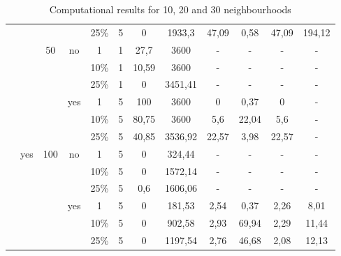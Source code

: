 \begin{table}[h!]
{\begin{tabular}{cccccccccccc}
            &   &   &   & 25\% & 5 & 0 & 1933,3 & 47,09 & 0,58 & 47,09 & 194,12 \bigstrut[b]\\
            \cline{3-12}      &   & \multirow{6}[4]{*}{50} & \multirow{3}[2]{*}{no} & 1 & 1 & 27,7 & 3600 & - & - & - & - \bigstrut[t]\\
            &   &   &   & 10\% & 1 & 10,59 & 3600 & - & - & - & - \\
            &   &   &   & 25\% & 1 & 0 & 3451,41 & - & - & - & - \bigstrut[b]\\
            \cline{4-12}      &   &   & \multirow{3}[2]{*}{yes} & 1 & 5 & 100 & 3600 & 0 & 0,37 & 0 & - \bigstrut[t]\\
            &   &   &   & 10\% & 5 & 80,75 & 3600 & 5,6 & 22,04 & 5,6 & - \\
            &   &   &   & 25\% & 5 & 40,85 & 3536,92 & 22,57 & 3,98 & 22,57 & - \bigstrut[b]\\
            \cline{2-12}      & \multirow{6}[4]{*}{yes} & \multirow{6}[4]{*}{100} & \multirow{3}[2]{*}{no} & 1 & 5 & 0 & 324,44 & - & - & - & - \bigstrut[t]\\
            &   &   &   & 10\% & 5 & 0 & 1572,14 & - & - & - & - \\
            &   &   &   & 25\% & 5 & 0,6 & 1606,06 & - & - & - & - \bigstrut[b]\\
            \cline{4-12}      &   &   & \multirow{3}[2]{*}{yes} & 1 & 5 & 0 & 181,53 & 2,54 & 0,37 & 2,26 & 8,01 \bigstrut[t]\\
            &   &   &   & 10\% & 5 & 0 & 902,58 & 2,93 & 69,94 & 2,29 & 11,44 \\
            &   &   &   & 25\% & 5 & 0 & 1197,54 & 2,76 & 46,68 & 2,08 & 12,13 \bigstrut[b]\\
            \hline
    \end{tabular}}%
    \caption{Computational results for 10, 20 and 30 neighbourhoods\label{tab:results1}}
\end{table}%